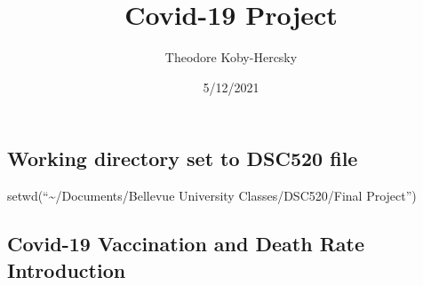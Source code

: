 \documentclass[
]{article}
\title{Covid-19 Project}
\author{Theodore Koby-Hercsky}
\date{5/12/2021}
\begin{document}
\maketitle

\hypertarget{working-directory-set-to-dsc520-file}{%
\subsection{Working directory set to DSC520
file}\label{working-directory-set-to-dsc520-file}}

setwd(``\textasciitilde/Documents/Bellevue University
Classes/DSC520/Final Project'')

\hypertarget{covid-19-vaccination-and-death-rate-introduction}{%
\subsection{Covid-19 Vaccination and Death Rate
Introduction}\label{covid-19-vaccination-and-death-rate-introduction}}
\end{document}
